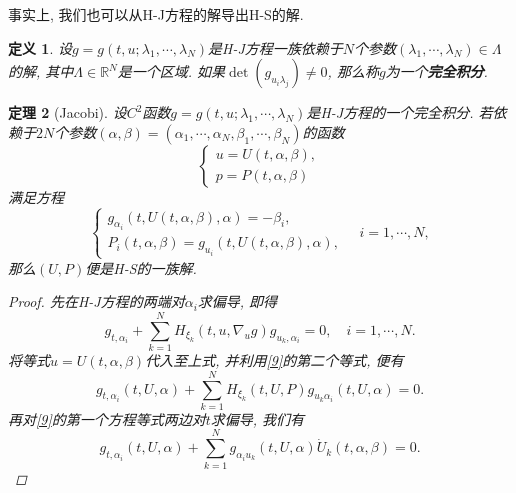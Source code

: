 \documentclass[12pt,a4paper]{article}
\newtheorem{theorem}{定理}[section]
\newtheorem{definition}[theorem]{定义}
\begin{document}
事实上, 我们也可以从H-J方程的解导出H-S的解.

\begin{definition}
    设$g = g(t, u; \lambda_1, \cdots, \lambda_N)$是H-J方程一族依赖于$N$个参数$(\lambda_1, \cdots, \lambda_N) \in \Lambda$的解, 其中$\Lambda \in \mathbb{R}^N$是一个区域.
    如果$\det(g_{u_i\lambda_j}) \neq 0$, 那么称$g$为一个\textbf{完全积分}.
\end{definition}

\begin{theorem}[Jacobi]
    设$C^2$函数$g = g(t, u; \lambda_1, \cdots, \lambda_N)$是H-J方程的一个完全积分. 若依赖于$2N$个参数$(\alpha, \beta) = (\alpha_1, \cdots, \alpha_N, \beta_1, \cdots, \beta_N)$的函数 
    \begin{equation*}
        \begin{cases} 
            u = U(t, \alpha, \beta), \\  
            p = P(t, \alpha, \beta)  
        \end{cases}
    \end{equation*}
    满足方程
    \begin{equation}\label{9}
        \begin{cases} 
            g_{\alpha_i}(t, U(t, \alpha, \beta), \alpha) = -\beta_i, \\  
            P_i(t, \alpha, \beta) = g_{u_i}(t, U(t, \alpha, \beta), \alpha),  
        \end{cases}  
        \quad  i = 1, \cdots, N,
    \end{equation}
    那么$(U, P)$便是H-S的一族解.
    \begin{proof}
        先在H-J方程的两端对$\alpha_i$求偏导, 即得 
        \begin{equation*}
            g_{t, \alpha_i} + \sum_{k = 1}^NH_{\xi_k}(t, u, \nabla_ug)g_{u_k, \alpha_i} = 0, \quad i = 1, \cdots, N.
        \end{equation*}
        将等式$u = U(t, \alpha, \beta)$代入至上式, 并利用\eqref{9}的第二个等式, 便有 
        \begin{equation}\label{10}
            g_{t, \alpha_i}(t, U, \alpha) + \sum_{k = 1}^NH_{\xi_k}(t, U, P)g_{u_k\alpha_i}(t, U, \alpha) = 0.
        \end{equation}
        再对\eqref{9}的第一个方程等式两边对$t$求偏导, 我们有
        \begin{equation}\label{11}
            g_{t, \alpha_i}(t, U, \alpha) + \sum_{k = 1}^Ng_{\alpha_iu_k}(t, U, \alpha)\dot U_k(t, \alpha, \beta) = 0.
        \end{equation} 

\end{proof}
\end{theorem}
\end{document}
